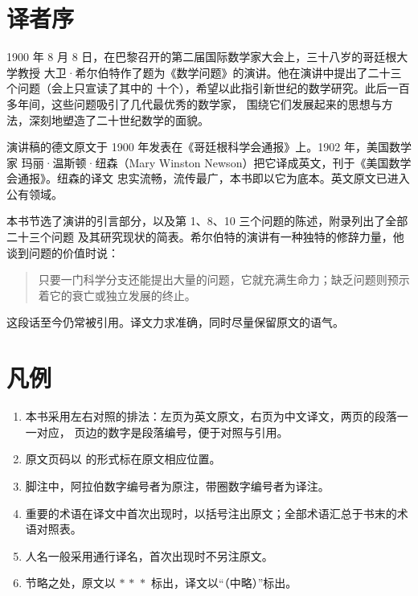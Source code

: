 \documentclass{mojing-translation}
\begin{document}
\frontmatter
\maketitle

\chapter{译者序}

1900 年 8 月 8 日，在巴黎召开的第二届国际数学家大会上，三十八岁的哥廷根大学教授
大卫·希尔伯特作了题为《数学问题》的演讲。他在演讲中提出了二十三个问题（会上只宣读了其中的
十个），希望以此指引新世纪的数学研究。此后一百多年间，这些问题吸引了几代最优秀的数学家，
围绕它们发展起来的思想与方法，深刻地塑造了二十世纪数学的面貌。

演讲稿的德文原文于 1900 年发表在《哥廷根科学会通报》上。1902 年，美国数学家
玛丽·温斯顿·纽森（Mary Winston Newson）把它译成英文，刊于《美国数学会通报》。纽森的译文
忠实流畅，流传最广，本书即以它为底本。英文原文已进入公有领域。

本书节选了演讲的引言部分，以及第 1、8、10 三个问题的陈述，附录列出了全部二十三个问题
及其研究现状的简表。希尔伯特的演讲有一种独特的修辞力量，他谈到问题的价值时说：
\begin{quote}
只要一门科学分支还能提出大量的问题，它就充满生命力；缺乏问题则预示着它的衰亡或独立发展的终止。
\end{quote}
这段话至今仍常被引用。译文力求准确，同时尽量保留原文的语气。

\chapter{凡例}

\begin{enumerate}[label=\arabic*.]
  \item 本书采用左右对照的排法：左页为英文原文，右页为中文译文，两页的段落一一对应，
        页边的数字是段落编号，便于对照与引用。
  \item 原文页码以  的形式标在原文相应位置。
  \item 脚注中，阿拉伯数字编号者为原注，带圈数字编号者为译注。
  \item 重要的术语在译文中首次出现时，以括号注出原文；全部术语汇总于书末的术语对照表。
  \item 人名一般采用通行译名，首次出现时不另注原文。
  \item 节略之处，原文以 \(*\,*\,*\) 标出，译文以“（中略）”标出。
\end{enumerate}
\end{document}
